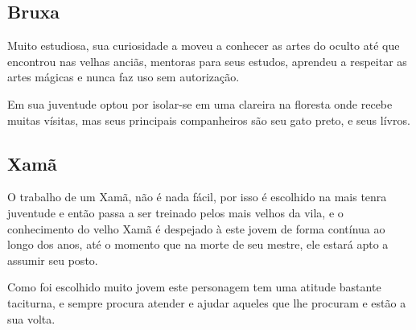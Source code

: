 
\subsection{Bruxa}
Muito estudiosa, sua curiosidade a moveu a conhecer as artes do oculto até que encontrou nas velhas anciãs, mentoras para seus estudos, aprendeu a respeitar as artes mágicas e nunca faz uso sem autorização. 

Em sua juventude optou por isolar-se em uma clareira na floresta onde recebe muitas vísitas, mas seus principais companheiros são seu gato preto, e seus lívros.






\subsection{Xamã}
O trabalho de um Xamã, não é nada fácil, por isso é escolhido na mais tenra juventude e então passa a ser treinado pelos mais velhos da vila, e o conhecimento do velho Xamã é despejado à este jovem de forma contínua ao longo dos anos, até o momento que na morte de seu mestre, ele estará apto a assumir seu posto.

Como foi escolhido muito jovem este personagem tem uma atitude bastante taciturna, e sempre procura atender e ajudar aqueles que lhe procuram e estão a sua volta.




